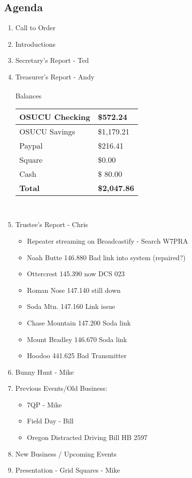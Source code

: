	\subsection*{Agenda}
	\begin{enumerate}
		\item Call to Order
		\item Introductions
		\item Secretary's Report - Ted
		\item Treasurer's Report - Andy \\ \\
				Balances
			\begin{tabular}{|l|l|} \hline
				OSUCU Checking & \$572.24 \\ \hline
				OSUCU Savings & \$1,179.21 \\ \hline
				Paypal & \$216.41 \\ \hline
				Square & \$0.00 \\ \hline
				Cash & \$ 80.00 \\ \hline
				\textbf{Total} & \textbf{\$2,047.86} \\ \hline
			\end{tabular} \\
		\item Trustee's Report - Chris
			\begin{itemize}
				\item Repeater streaming on Broadcastify - Search W7PRA
				\item Noah Butte 146.880 Bad link into system (repaired?)
				\item Ottercrest 145.390 now DCS 023
				\item Roman Nose 147.140 still down
				\item Soda Mtn. 147.160 Link issue
				\item Chase Mountain 147.200 Soda link
				\item Mount Bradley 146.670 Soda link
				\item Hoodoo 441.625 Bad Transmitter			
			\end{itemize}
		\item Bunny Hunt - Mike
		\item Previous Events/Old Business:
			\begin{itemize}
				\item 7QP - Mike
				\item Field Day - Bill
				\item Oregon Distracted Driving Bill HB 2597
			\end{itemize}
		\item  New Business / Upcoming Events
		\item  Presentation - Grid Squares - Mike
	\end{enumerate}

